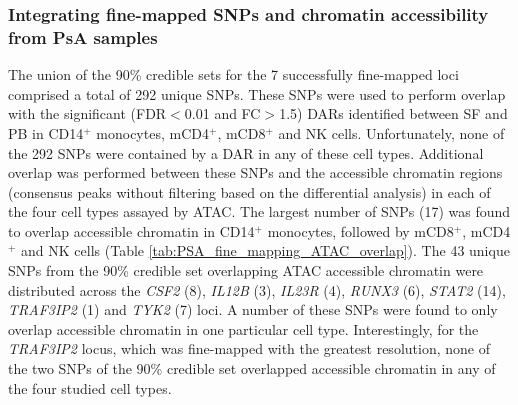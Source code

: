 \subsubsection{Integrating fine-mapped SNPs and chromatin accessibility from PsA samples}
The union of the 90\% credible sets for the 7 successfully fine-mapped loci comprised a total of 292 unique SNPs. These SNPs were used to perform overlap with the significant (FDR$<$0.01 and FC$>$1.5) DARs identified between SF and PB in CD14$^+$ monocytes, mCD4$^+$, mCD8$^+$ and NK cells. Unfortunately, none of the 292 SNPs were contained by a DAR in any of these cell types. Additional overlap was performed between these SNPs and the accessible chromatin regions (consensus peaks without filtering based on the differential analysis) in each of the four cell types assayed by ATAC. The largest number of SNPs (17) was found to overlap accessible chromatin in CD14$^+$ monocytes, followed by mCD8$^+$, mCD4$^+$ and NK cells (Table \ref{tab:PSA_fine_mapping_ATAC_overlap}). The 43 unique SNPs from the 90\% credible set overlapping ATAC accessible chromatin were distributed across the \textit{CSF2} (8), \textit{IL12B} (3), \textit{IL23R} (4), \textit{RUNX3} (6), \textit{STAT2} (14), \textit{TRAF3IP2} (1) and \textit{TYK2} (7) loci. A number of these SNPs were found to only overlap accessible chromatin in one particular cell type. Interestingly, for the \textit{TRAF3IP2} locus, which was fine-mapped with the greatest resolution, none of the two SNPs of the 90\% credible set overlapped accessible chromatin in any of the four studied cell types.


